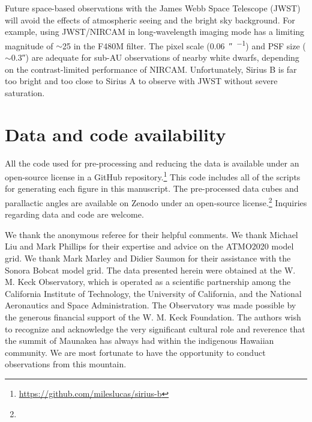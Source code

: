 \documentclass[twocolumn,linenumbers]{aastex631}
\begin{document}
Future space-based observations with the James Webb Space Telescope (JWST) will avoid the effects of atmospheric seeing and the bright sky background. For example, using JWST/NIRCAM in long-wavelength imaging mode has a limiting magnitude of $\sim$25 in the F480M filter. The pixel scale (\qty{0.06}{\arcsecond\per\pixel}) and PSF size ($\sim$\ang{;;0.3}) are adequate for sub-AU observations of nearby white dwarfs, depending on the contrast-limited performance of NIRCAM. Unfortunately, Sirius B is far too bright and too close to Sirius A to observe with JWST without severe saturation.


\section{Data and code availability}\label{sec:data}

All the code used for pre-processing and reducing the data is available under an open-source license in a GitHub repository.\footnote{\url{https://github.com/mileslucas/sirius-b}} This code includes all of the scripts for generating each figure in this manuscript. The pre-processed data cubes and parallactic angles are available on Zenodo under an open-source license.\footnote{} Inquiries regarding data and code are welcome.

\begin{acknowledgements}
We thank the anonymous referee for their helpful comments. We thank Michael Liu and Mark Phillips for their expertise and advice on the ATMO2020 model grid. We thank Mark Marley and Didier Saumon for their assistance with the Sonora Bobcat model grid. The data presented herein were obtained at the W. M. Keck Observatory, which is operated as a scientific partnership among the California Institute of Technology, the University of California, and the National Aeronautics and Space Administration. The Observatory was made possible by the generous financial support of the W. M. Keck Foundation. The authors wish to recognize and acknowledge the very significant cultural role and reverence that the summit of Maunakea has always had within the indigenous Hawaiian community. We are most fortunate to have the opportunity to conduct observations from this mountain.
\end{acknowledgements}



\end{document}
